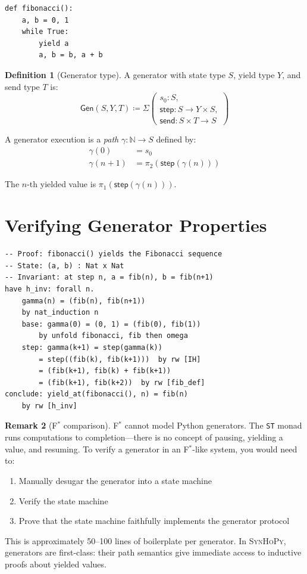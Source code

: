 \documentclass[11pt,a4paper]{report}
\theoremstyle{definition}
\newtheorem{definition}{Definition}[chapter]
\newtheorem{remark}[definition]{Remark}
\theoremstyle{plain}
\newcommand{\Nat}{\mathbb{N}}
\newcommand{\defeq}{\coloneqq}
\newcommand{\fstar}{F$^{*}$}
\newcommand{\synhopy}{\textsc{SynHoPy}}
\begin{document}
\begin{lstlisting}[style=python]
def fibonacci():
    a, b = 0, 1
    while True:
        yield a
        a, b = b, a + b
\end{lstlisting}

\begin{definition}[Generator type]
A generator with state type $S$, yield type $Y$, and send type $T$ is:
\[
  \mathsf{Gen}(S, Y, T) \defeq \Sigma\left(
    \begin{array}{l}
      s_0 : S, \\
      \mathsf{step} : S \to Y \times S, \\
      \mathsf{send} : S \times T \to S
    \end{array}
  \right)
\]
\end{definition}

A generator execution is a \emph{path} $\gamma : \Nat \to S$ defined by:
\begin{align}
  \gamma(0) &= s_0 \\
  \gamma(n+1) &= \pi_2(\mathsf{step}(\gamma(n)))
\end{align}

The $n$-th yielded value is $\pi_1(\mathsf{step}(\gamma(n)))$.

\section{Verifying Generator Properties}

\begin{lstlisting}[style=proof]
-- Proof: fibonacci() yields the Fibonacci sequence
-- State: (a, b) : Nat x Nat
-- Invariant: at step n, a = fib(n), b = fib(n+1)
have h_inv: forall n.
    gamma(n) = (fib(n), fib(n+1))
    by nat_induction n
    base: gamma(0) = (0, 1) = (fib(0), fib(1))
        by unfold fibonacci, fib then omega
    step: gamma(k+1) = step(gamma(k))
        = step((fib(k), fib(k+1)))  by rw [IH]
        = (fib(k+1), fib(k) + fib(k+1))
        = (fib(k+1), fib(k+2))  by rw [fib_def]
conclude: yield_at(fibonacci(), n) = fib(n)
    by rw [h_inv]
\end{lstlisting}

\begin{remark}[\fstar{} comparison]
\fstar{} cannot model Python generators. The \lstinline[style=fstar]{ST} monad runs
computations to completion---there is no concept of pausing, yielding a value,
and resuming. To verify a generator in an \fstar{}-like system, you would need to:
\begin{enumerate}
  \item Manually desugar the generator into a state machine
  \item Verify the state machine
  \item Prove that the state machine faithfully implements the generator protocol
\end{enumerate}
This is approximately 50--100 lines of boilerplate per generator. In \synhopy{},
generators are first-class: their path semantics give immediate access to
inductive proofs about yielded values.
\end{remark}
\end{document}
